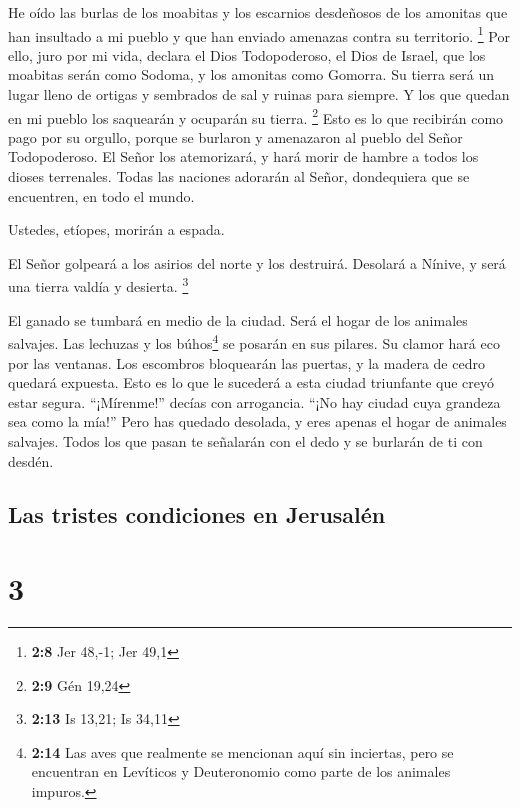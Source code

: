  He oído las burlas de los moabitas y los escarnios
desdeñosos de los amonitas que han insultado a mi pueblo y que han
enviado amenazas contra su territorio. \footnote{\textbf{2:8} Jer 48,-1;
  Jer 49,1}  Por ello, juro por mi vida, declara el Dios
Todopoderoso, el Dios de Israel, que los moabitas serán como Sodoma, y
los amonitas como Gomorra. Su tierra será un lugar lleno de ortigas y
sembrados de sal y ruinas para siempre. Y los que quedan en mi pueblo
los saquearán y ocuparán su tierra. \footnote{\textbf{2:9} Gén 19,24}
 Esto es lo que recibirán como pago por su orgullo,
porque se burlaron y amenazaron al pueblo del Señor Todopoderoso.
 El Señor los atemorizará, y hará morir de hambre a todos
los dioses terrenales. Todas las naciones adorarán al Señor, dondequiera
que se encuentren, en todo el mundo.

 Ustedes, etíopes, morirán a espada.

 El Señor golpeará a los asirios del norte y los
destruirá. Desolará a Nínive, y será una tierra valdía y desierta.
\footnote{\textbf{2:13} Is 13,21; Is 34,11}

 El ganado se tumbará en medio de la ciudad. Será el
hogar de los animales salvajes. Las lechuzas y los búhos\footnote{\textbf{2:14}
  Las aves que realmente se mencionan aquí sin inciertas, pero se
  encuentran en Levíticos y Deuteronomio como parte de los animales
  impuros.} se posarán en sus pilares. Su clamor hará eco por las
ventanas. Los escombros bloquearán las puertas, y la madera de cedro
quedará expuesta.  Esto es lo que le sucederá a esta
ciudad triunfante que creyó estar segura. ``¡Mírenme!'' decías con
arrogancia. ``¡No hay ciudad cuya grandeza sea como la mía!'' Pero has
quedado desolada, y eres apenas el hogar de animales salvajes. Todos los
que pasan te señalarán con el dedo y se burlarán de ti con desdén.

\hypertarget{las-tristes-condiciones-en-jerusaluxe9n}{%
\subsection{Las tristes condiciones en
Jerusalén}\label{las-tristes-condiciones-en-jerusaluxe9n}}

\hypertarget{section-2}{%
\section{3}\label{section-2}}

